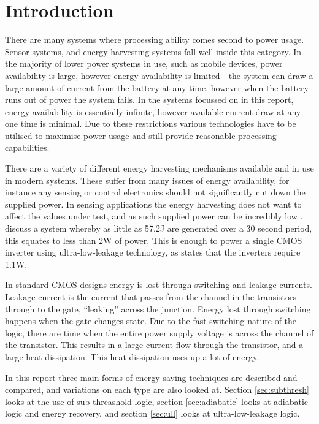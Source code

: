 \section{Introduction}
\label{sec:intro}
There are many systems where processing ability comes second to power usage.
Sensor systems, and energy harvesting systems fall well inside this category.
In the majority of lower power systems in use, such as mobile devices, power availability is large, however energy availability is limited - the system can draw a large amount of current from the battery at any time, however when the battery runs out of power the system fails.
In the systems focussed on in this report, energy availability is essentially infinite, however available current draw at any one time is minimal.
Due to these restrictions various technologies have to be utilised to maximise power usage and still provide reasonable processing capabilities.

There are a variety of different energy harvesting mechanisms available and in use in modern systems.
These suffer from many issues of energy availability, for instance any sensing or control electronics should not significantly cut down the supplied power.
In sensing applications the energy harvesting does not want to affect the values under test, and as such supplied power can be incredibly low \cite{ExperimentalHybridVibration,CMAirTurbine}.
\cite{ExperimentalHybridVibration} discuss a system whereby as little as 57.2\textmu J are generated over a 30 second period, this equates to less than 2\textmu W of power.
This is enough to power a single CMOS inverter using ultra-low-leakage technology, as \citeauthor{ULL-AandD} \cite{ULL-AandD} states that the inverters require 1.1\textmu W.

In standard CMOS designs energy is lost through switching and leakage currents.
Leakage current is the current that passes from the channel in the transistors through to the gate, ``leaking'' across the junction.
Energy lost through switching happens when the gate changes state.
Due to the fast switching nature of the logic, there are time when the entire power supply voltage is across the channel of the transistor.
This results in a large current flow through the transistor, and a large heat dissipation.
This heat dissipation uses up a lot of energy.

In this report three main forms of energy saving techniques are described and compared, and variations on each type are also looked at.
Section \ref{sec:subthresh} looks at the use of sub-threashold logic, section \ref{sec:adiabatic} looks at adiabatic logic and energy recovery, and section \ref{sec:ull} looks at ultra-low-leakage logic.
